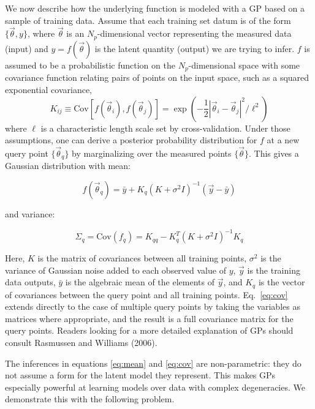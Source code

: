 \documentclass[prd,nofootbib,floatfix,11pt,tightenlines]{revtex4}
\begin{document}
We now describe how the underlying function is modeled with a GP based on a
sample of training data.  Assume that each training set datum is of the
form $\{\vec{\theta},y\}$, where $\vec{\theta}$ is an $N_p$-dimensional
vector representing the measured data (input) and $y = f(\vec{\theta})$ is the
latent quantity (output) we are trying to infer.  $f$ is assumed to be a
probabilistic function on the $N_p$-dimensional space with some covariance
function relating pairs of points on the input space, such as a squared
exponential covariance,
\begin{equation}
\label{eq:covariogram}
K_{ij}\equiv\text{Cov}\left[f(\vec{\theta}_{i}),f(\vec{\theta}_{j})\right]
= \exp(-\frac{1}{2}|\vec{\theta}_{i} - \vec{\theta}_{j}|^2/\ell^2)
\end{equation}
where $\ell$
is a characteristic length scale set by cross-validation.  
Under those
assumptions, one can derive a posterior probability distribution for $f$
at a new query point $\{\vec{\theta}_{q}\}$ by marginalizing over
the measured points $\{\vec{\theta}\}$.  This gives a Gaussian distribution
with mean:

\begin{equation}
f(\vec{\theta}_q)=\bar{y}+K_q\left(K+\sigma^2 I\right)^{-1}(\vec{y}-\bar{y})
\label{eq:mean}
\end{equation}

\noindent
and variance:

\begin{equation}
\Sigma_{q} = \text{Cov}(f_{q}) = K_{qq} - K_q^T (K + \sigma^2I)^{-1} K_q
\label{eq:cov}
\end{equation}

\noindent
Here, $K$ is the matrix of
covariances between all training points, $\sigma^2$ is the variance of
Gaussian noise added to each observed value of $y$, $\vec{y}$
is the training data outputs, $\bar{y}$ is the algebraic mean of the elements of
$\vec{y}$, and
$K_q$ is the vector of covariances between the query point and all
training points.  Eq.~\ref{eq:cov} extends directly to the case of multiple
query points by taking the variables as matrices where appropriate, and the
result is a full covariance matrix for the query points.  Readers looking
for a more detailed explanation of GPs should consult
Rasmussen and Williams (2006).


The inferences in equations \ref{eq:mean} and \ref{eq:cov} are non-parametric:
they do not assume a form for the latent model they represent.  This makes GPs
especially powerful at learning models over data
with complex degeneracies.  We demonstrate this with the following problem.
\end{document}
